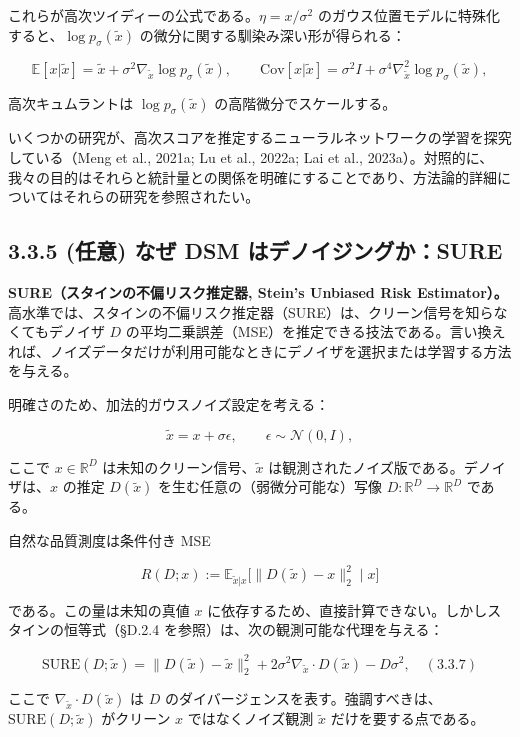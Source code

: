 これらが高次ツイディーの公式である。$\eta=x/\sigma^2$ のガウス位置モデルに特殊化すると、$\log p_\sigma(\tilde{x})$ の微分に関する馴染み深い形が得られる：

\[
\mathbb{E}[x|\tilde{x}]=\tilde{x}+\sigma^2\nabla_{\tilde{x}}\log p_\sigma(\tilde{x}),\qquad
\mathrm{Cov}[x|\tilde{x}]=\sigma^2 I+\sigma^4\nabla_{\tilde{x}}^2\log p_\sigma(\tilde{x}),
\]


高次キュムラントは $\log p_\sigma(\tilde{x})$ の高階微分でスケールする。

いくつかの研究が、高次スコアを推定するニューラルネットワークの学習を探究している（Meng et al., 2021a; Lu et al., 2022a; Lai et al., 2023a）。対照的に、我々の目的はそれらと統計量との関係を明確にすることであり、方法論的詳細についてはそれらの研究を参照されたい。

\subsection*{3.3.5 (任意) なぜ DSM はデノイジングか：SURE}


\textbf{SURE（スタインの不偏リスク推定器, Stein's Unbiased Risk Estimator）。} 高水準では、スタインの不偏リスク推定器（SURE）は、クリーン信号を知らなくてもデノイザ $D$ の平均二乗誤差（MSE）を推定できる技法である。言い換えれば、ノイズデータだけが利用可能なときにデノイザを選択または学習する方法を与える。

明確さのため、加法的ガウスノイズ設定を考える：

\[
\tilde{x}=x+\sigma\epsilon,\qquad\epsilon\sim\mathcal{N}(0,I),
\]


ここで $x\in\mathbb{R}^D$ は未知のクリーン信号、$\tilde{x}$ は観測されたノイズ版である。デノイザは、$x$ の推定 $D(\tilde{x})$ を生む任意の（弱微分可能な）写像 $D:\mathbb{R}^D\to\mathbb{R}^D$ である。

自然な品質測度は条件付き MSE

\[
R(D;x):=\mathbb{E}_{\tilde{x}|x}\bigl[\|D(\tilde{x})-x\|_2^2\mid x\bigr]
\]


である。この量は未知の真値 $x$ に依存するため、直接計算できない。しかしスタインの恒等式（§D.2.4 を参照）は、次の観測可能な代理を与える：

\[
\mathrm{SURE}(D;\tilde{x})
= \|D(\tilde{x})-\tilde{x}\|_2^2 + 2\sigma^2\nabla_{\tilde{x}}\cdot D(\tilde{x}) - D\sigma^2,\quad (3.3.7)
\]


ここで $\nabla_{\tilde{x}}\cdot D(\tilde{x})$ は $D$ のダイバージェンスを表す。強調すべきは、$\mathrm{SURE}(D;\tilde{x})$ がクリーン $x$ ではなくノイズ観測 $\tilde{x}$ だけを要する点である。

